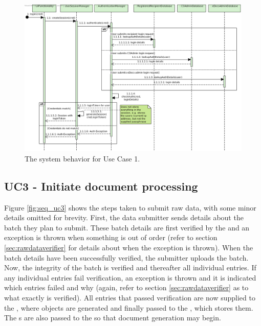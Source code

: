 \begin{figure}[!htp]
    \centering
    \includegraphics[width=\textwidth]{figures/UC1 - Login.png}
    \caption{The system behavior for Use Case 1.
        }\label{fig:seq_uc1}
\end{figure}

\subsection{UC3 - Initiate document processing}
Figure \ref{fig:seq_uc3} shows the steps taken to submit raw data, with some minor details omitted for brevity. First, the data submitter sends details about the batch they plan to submit. These batch details are first verified by the  and an exception is thrown when something is out of order (refer to section \ref{sec:rawdataverifier} for details about when the exception is thrown). When the batch details have been successfully verified, the submitter uploads the batch. Now, the integrity of the batch is verified and thereafter all individual entries. If any individual entries fail verification, an exception is thrown and it is indicated which entries failed and why (again, refer to section \ref{sec:rawdataverifier} as to what exactly is verified). All entries that passed verification are now supplied to the , where  objects are generated and finally passed to the , which stores them. The s are also passed to the  so that document generation may begin. 


